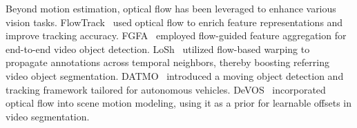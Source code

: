 Beyond motion estimation, optical flow has been leveraged to enhance various vision tasks. FlowTrack~\cite{zhu2018flowtrack} used optical flow to enrich feature representations and improve tracking accuracy. FGFA~\cite{zhu2017fgfa} employed flow-guided feature aggregation for end-to-end video object detection. LoSh~\cite{Yuan_2024_LoSh} utilized flow-based warping to propagate annotations across temporal neighbors, thereby boosting referring video object segmentation. DATMO~\cite{sormoli2024optical} introduced a moving object detection and tracking framework tailored for autonomous vehicles. DeVOS~\cite{Fedynyak_2024_DeVos} incorporated optical flow into scene motion modeling, using it as a prior for learnable offsets in video segmentation.